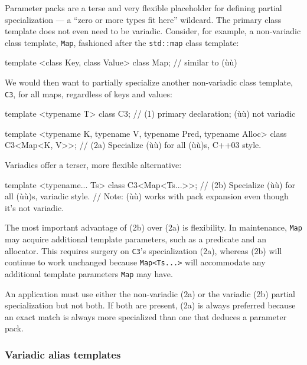 \noindent Parameter packs are a terse and very flexible placeholder for defining
partial specialization --- a ``zero or more types fit here'' wildcard.
The primary class template does not even need to be variadic. Consider,
for example, a non-variadic class template, \lstinline!Map!, fashioned
after the \lstinline!std::map! class template:

\begin{emcppslisting}
template <class Key, class Value> class Map;  // similar to (ù{}ù)
\end{emcppslisting}
    

\noindent We would then want to partially specialize another non-variadic class
template, \lstinline!C3!, for all maps, regardless of keys and values:

\begin{emcppslisting}
template <typename T> class C3;  // (1) primary declaration; (ù{}ù) not variadic

template <typename K, typename V, typename Pred, typename Alloc>
class C3<Map<K, V>>;
    // (2a) Specialize (ù{}ù) for all (ù{}ù)s, C++03 style.
\end{emcppslisting}
    

\noindent Variadics offer a terser, more flexible alternative:

\begin{emcppslisting}
template <typename... Ts>
class C3<Map<Ts...>>;
    // (2b) Specialize (ù{}ù) for all (ù{}ù)s, variadic style.
    // Note: (ù{}ù) works with pack expansion even though it's not variadic.
\end{emcppslisting}
    

\noindent The most important advantage of (2b) over (2a) is flexibility. In
maintenance, \lstinline!Map! may acquire additional template parameters,
such as a predicate and an allocator. This requires surgery on
\lstinline!C3!'s specialization (2a), whereas (2b) will continue to work
unchanged because \lstinline!Map<Ts...>! will accommodate any additional
template parameters \lstinline!Map! may have.

An application must use either the non-variadic (2a) or the variadic
(2b) partial specialization but not both. If both are present, (2a) is
always preferred because an exact match is always more specialized than
one that deduces a parameter pack.

\subsubsection[Variadic alias templates]{Variadic alias templates}\label{variadic-alias-templates}

